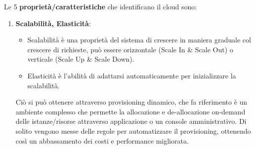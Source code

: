 \documentclass[11pt, twocolumn]{article}
\begin{document}
Le 5 \textbf{proprietà/caratteristiche} che identificano il cloud sono:
\begin{enumerate}[noitemsep, topsep=0ex, leftmargin=*]
	\item \textbf{Scalabilità, Elasticità}:
	\begin{itemize}[noitemsep, topsep=0ex, leftmargin=*]
		\item Scalabilità è una proprietà del sistema di crescere in maniera graduale col crescere di richieste, può essere orizzontale (Scale In \& Scale Out) o verticale (Scale Up \& Scale Down).
		\item Elasticità è l'abilità di adattarsi automaticamente per inizializzare la scalabilità.
	\end{itemize}
	Ciò si può ottenere attraverso provisioning dinamico, che fa riferimento è un ambiente complesso che permette la allocazione e de-allocazione on-demand delle istanze/risorse attraverso applicazione o un console amministrativo. 
	Di solito vengono messe delle regole per automatizzare il provisioning, ottenendo così un abbassamento dei costi e performance migliorata.
	

\end{enumerate}
\end{document}
